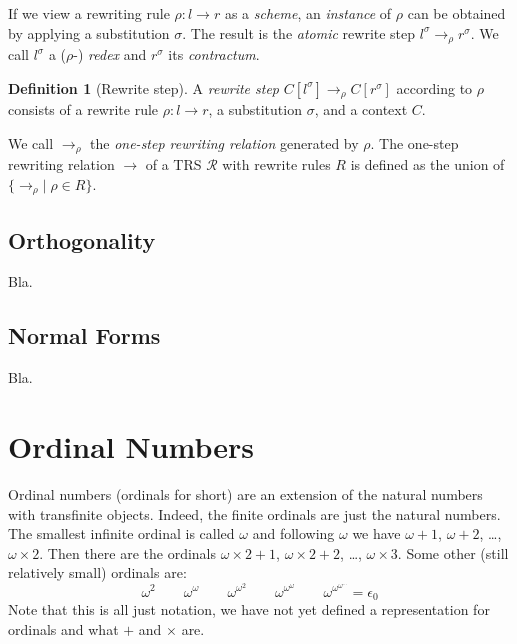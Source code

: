 \documentclass[11pt,oneside,a4paper,final]{report}
\theoremstyle{definition}
\newtheorem{definition}{Definition}
\begin{document}
If we view a rewriting rule $\rho : l \rightarrow r$ as a \emph{scheme}, an
\emph{instance} of $\rho$ can be obtained by applying a substitution
$\sigma$. The result is the \emph{atomic} rewrite step $l^\sigma
\rightarrow_\rho r^\sigma$. We call $l^\sigma$ a ($\rho$-) \emph{redex} and
$r^\sigma$ its \emph{contractum}.

\begin{definition}[Rewrite step]
A \emph{rewrite step} $C[l^\sigma] \rightarrow_\rho C[r^\sigma]$ according to
$\rho$ consists of a rewrite rule $\rho : l \rightarrow r$, a substitution
$\sigma$, and a context $C$.
\end{definition}

We call $\rightarrow_\rho$ the \emph{one-step rewriting relation} generated by
$\rho$. The one-step rewriting relation $\rightarrow$ of a TRS $\mathcal{R}$
with rewrite rules $R$ is defined as the union of $\{ \rightarrow_\rho | \;
\rho \in R \}$.


\subsection{Orthogonality}

Bla.


\subsection{Normal Forms}

Bla.


\section{Ordinal Numbers}


Ordinal numbers (ordinals for short) are an extension of the natural numbers
with transfinite objects. Indeed, the finite ordinals are just the natural
numbers. The smallest infinite ordinal is called $\omega$ and following
$\omega$ we have $\omega + 1$, $\omega + 2$, \ldots, $\omega \times 2$. Then
there are the ordinals $\omega \times 2 + 1$, $\omega \times 2 + 2$, \ldots,
$\omega \times 3$. Some other (still relatively small) ordinals are:
\begin{displaymath}
  \omega^2 \qquad
  \omega^\omega \qquad
  \omega^{\omega^2} \qquad
  \omega^{\omega^\omega} \qquad
  \omega^{\omega^{\omega^{\ldots}}} = \epsilon_0 %
\end{displaymath}
Note that this is all just notation, we have not yet defined a representation
for ordinals and what $+$ and $\times$ are.
\end{document}
